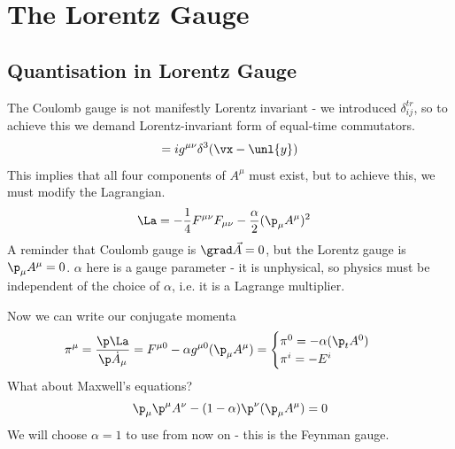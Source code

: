 \documentclass[a4paper, 11pt, normalem]{report}
\newcommand\hpi{\hat{\pi}}
\newcommand\vy{\unl{y}}
\begin{document}
\chapter{The Lorentz Gauge}
\section{Quantisation in Lorentz Gauge}
The Coulomb gauge is not manifestly Lorentz invariant - we introduced $\delta_{ij}^{tr}$, so to achieve this we demand Lorentz-invariant form of equal-time commutators.
\begin{align}
    [\hat{A}^\mu(\vx,t),\hpi^\nu(\vy,t)] = ig^{\mu\nu}\delta^3(\vx-\vy)
\end{align}
This implies that all four components of $A^\mu$ must exist, but to achieve this, we must modify the Lagrangian.
\begin{align}
    \La &= -\frac14F^{\mu\nu}F_{\mu\nu} - \frac{\alpha}{2}(\p_\mu A^\mu)^2
\end{align}
A reminder that Coulomb gauge is $\grad\vec{A} = 0$, but the Lorentz gauge is $\p_\mu A^\mu = 0$.
$\alpha$ here is a gauge parameter - it is unphysical, so physics must be independent of the choice of $\alpha$, i.e. it is a Lagrange multiplier.

Now we can write our conjugate momenta
\begin{align}
    \pi^\mu &= \frac{\p\La}{\p\dot{A}_\mu} = F^{\mu 0} - \alpha g^{\mu 0}(\p_\mu A^\mu) = \begin{cases} \pi^0 = -\alpha(\p_tA^0) & \\ \pi^i = -E^i & \end{cases}
\end{align}
What about Maxwell's equations?
\begin{align}
    \p_\mu\p^\mu A^\nu - (1-\alpha)\p^\nu(\p_\mu A^\mu) = 0
\end{align}
We will choose $\alpha=1$ to use from now on - this is the Feynman gauge.
\end{document}
